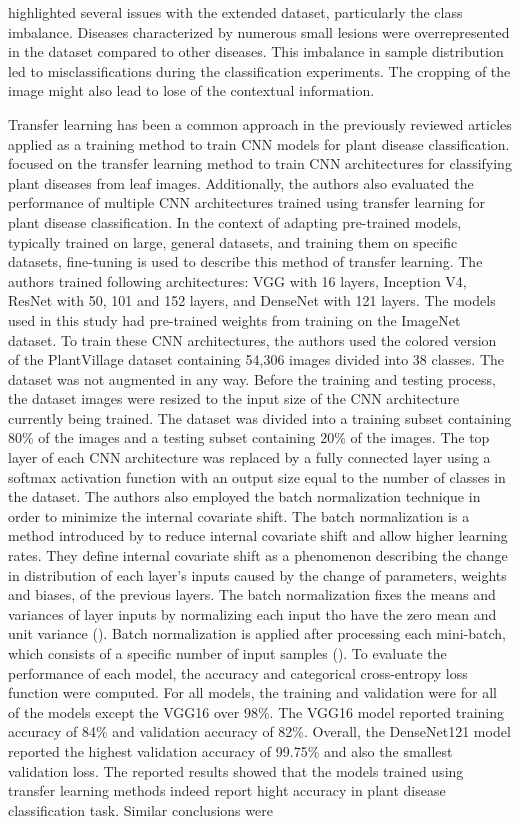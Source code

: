 \documentclass{BachelorBUI}
\begin{document}
highlighted several issues with the extended dataset, particularly the class imbalance. Diseases characterized by numerous small lesions were overrepresented in the dataset compared to other diseases. This imbalance in sample distribution led to misclassifications during the classification experiments. The cropping of the image might also lead to lose of the contextual information.

Transfer learning has been a common approach in the previously reviewed articles applied as a training method to train CNN models for plant disease classification. \textcite{Too:2019} focused on the transfer learning method to train CNN architectures for classifying plant diseases from leaf images. Additionally, the authors also evaluated the performance of multiple CNN architectures trained using transfer learning for plant disease classification. In the context of adapting pre-trained models, typically trained on large, general datasets, and training them on specific datasets, fine-tuning is used to describe this method of transfer learning. The authors trained following architectures: VGG with 16 layers, Inception V4, ResNet with 50, 101 and 152 layers, and DenseNet with 121 layers. The models used in this study had pre-trained weights from training on the ImageNet dataset. To train these CNN architectures, the authors used the colored version of the PlantVillage dataset containing 54,306 images divided into 38 classes. The dataset was not augmented in any way. Before the training and testing process, the dataset images were resized to the input size of the CNN architecture currently being trained. The dataset was divided into a training subset containing 80\% of the images and a testing subset containing 20\% of the images. The top layer of each CNN architecture was replaced by a fully connected layer using a softmax activation function with an output size equal to the number of classes in the dataset. The authors also employed the batch normalization technique in order to minimize the internal covariate shift. The batch normalization is a method introduced by \textcite{Szegedy:2015:2} to reduce internal covariate shift and allow higher learning rates. They define internal covariate shift as a phenomenon describing the change in distribution of each layer's inputs caused by the change of parameters, weights and biases, of the previous layers. The batch normalization fixes the means and variances of layer inputs by normalizing each input tho have the zero mean and unit variance (\cite{Szegedy:2015:2}). Batch normalization is applied after processing each mini-batch, which consists of a specific number of input samples (\cite{Szegedy:2015:2}). To evaluate the performance of each model, the accuracy and categorical cross-entropy loss function were computed. For all models, the training and validation were for all of the models except the VGG16 over 98\%. The VGG16 model reported training accuracy of 84\% and validation accuracy of 82\%. Overall, the DenseNet121 model reported the highest validation accuracy of 99.75\% and also the smallest validation loss. The reported results showed that the models trained using transfer learning methods indeed report hight accuracy in plant disease classification task. Similar conclusions were 
\end{document}
